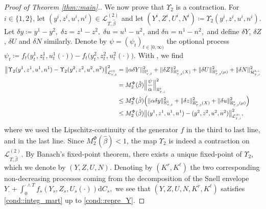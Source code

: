 \documentclass[10pt]{article} %
\newcommand\cH{\mathcal H}
\newcommand\cL{\mathcal L}
\newcommand{\smalltext}[1]{\text{\fontsize{4}{4}\selectfont$#1$}}
\def \H{\mathbb{H}}
\def\d{\mathrm{d}}
\begin{document}
\begin{proof}[Proof of Theorem \ref{thm::main}.]
	\medskip
	We now prove that $\Upsilon_2$ is a contraction. For $i \in \{1,2\}$, let $(y^i,z^i,u^i,n^i) \in \cL^{(2)}_{T,\hat\beta}$ and let $(Y^i, Z^i,U^i,N^i) \coloneqq \Upsilon_2(y^i,z^i,u^i,n^i)$. Let $\delta y \coloneqq y^1 - y^2, \; \delta z = z^1 - z^2, \; \delta u = u^1 - u^2 ,\; \text{and} \; \delta n = n^1 - n^2,$
	and define $\delta Y$, $\delta Z$, $\delta U$ and $\delta N$ similarly. Denote by $\psi = (\psi_t)_{t \in [0,\infty)}$ the optional process $\psi_t \coloneqq f_t \big(y^1_t,z^1_t,u^1_t(\cdot)\big) - f_t\big(y^2_t,z^2_t,u^2_t(\cdot)\big).$ With , we find
	\begin{align*}
		\big\| \Upsilon_2(y^1,z^1,u^1,n^1) - \Upsilon_2(y^2,z^2,u^2,n^2) \big\|^2_{\cL^\smalltext{(2)}_{\smalltext{T}\smalltext{,}\smalltext{\hat\beta}}} 
		&= \|\alpha\delta Y\|^2_{\H^\smalltext{2}_{\smalltext{T}\smalltext{,}\smalltext{\hat\beta}}} + \|\delta Z\|^2_{\H^\smalltext{2}_{\smalltext{T}\smalltext{,}\smalltext{\hat\beta}}(X)} + \|\delta U\|^2_{\H^\smalltext{2}_{\smalltext{T}\smalltext{,}\smalltext{\hat\beta}}(\mu)} + \|\delta N\|^2_{\cH^{\smalltext{2}\smalltext{,}\smalltext{\perp}}_{\smalltext{T}\smalltext{,}\smalltext{\hat\beta}}} \nonumber\\
		&= M^\Phi_2(\hat\beta) \Big\| \frac{\psi}{\alpha} \Big\|^2_{\H^\smalltext{2}_{\smalltext{T}\smalltext{,}\smalltext{\hat\beta}}} \nonumber\\
		&\leq M^\Phi_2(\hat\beta) \Big( \|\alpha\delta y\|^2_{\H^\smalltext{2}_{\smalltext{T}\smalltext{,}\smalltext{\hat\beta}}} + \|\delta z\|^2_{\H^\smalltext{2}_{\smalltext{T}\smalltext{,}\smalltext{\hat\beta}}(X)} + \|\delta u\|^2_{\H^\smalltext{2}_{\smalltext{T}\smalltext{,}\smalltext{\hat\beta}}(\mu)} \Big)  \nonumber\\
		&\leq M^\Phi_2(\hat\beta) \big\|(y^1, z^1, u^1, n^1) - (y^2, z^2, u^2, n^2)\big\|^2_{\cL^\smalltext{(2)}_{\smalltext{T}\smalltext{,}\smalltext{\hat\beta}}},
	\end{align*}
	where we used the Lipschitz-continuity of the generator $f$ in the third to last line, and  in the last line. Since $M^\Phi_2(\hat\beta) < 1$, the map $\Upsilon_2$ is indeed a contraction on $\cL^{(2)}_{T,\hat\beta}$. By Banach's fixed-point theorem, there exists a unique fixed-point of $\Upsilon_2$, which we denote by $(Y,Z,U,N)$. Denoting by $(K^r,K^\ell)$ the two corresponding non-decreasing processes coming from the decomposition of the Snell envelope $Y_\cdot + \int_0^{\cdot \land T} f_s(Y_s,Z_s,U_s(\cdot))\d C_s,$ we see that $(Y,Z,U,N,K^r,K^\ell)$ satisfies \ref{cond::integ_mart} up to \ref{cond::repre_Y}. 
	

\end{proof}
\end{document}

